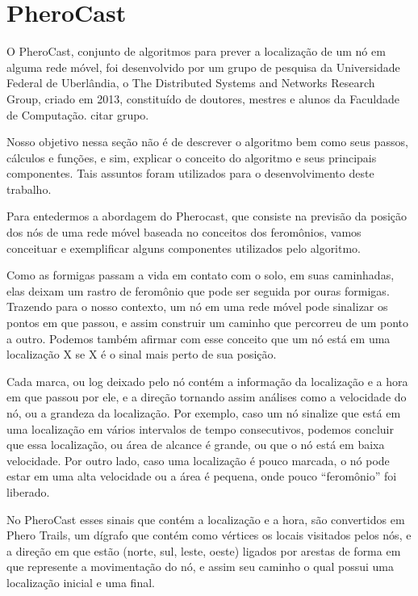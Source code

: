 \documentclass[12pt, %
openright, 
oneside,
a4paper,
brazil]{facom-ufu-abntex2}
\begin{document}
\section{PheroCast}

	O PheroCast, conjunto de algoritmos para prever a localização de um nó em alguma rede móvel, foi desenvolvido por um grupo de pesquisa da Universidade Federal de Uberlândia, o The Distributed Systems and Networks  Research Group, criado em 2013, constituído de doutores, mestres e alunos da Faculdade de Computação. citar grupo. 
	
	Nosso objetivo nessa seção não é de descrever o algoritmo bem como seus passos, cálculos e funções, e sim, explicar o conceito do algoritmo e seus principais componentes. Tais assuntos foram utilizados para o desenvolvimento deste trabalho.
	
	Para entedermos a abordagem do Pherocast, que consiste na previsão da posição dos nós de uma rede móvel baseada no conceitos dos feromônios, vamos conceituar e exemplificar alguns componentes utilizados pelo algoritmo.

	Como as formigas passam a vida em contato com o solo, em suas caminhadas, elas deixam um rastro de feromônio que pode ser seguida por ouras formigas. Trazendo para o nosso contexto, um nó em uma rede móvel pode sinalizar os pontos em que passou, e assim construir um caminho que percorreu de um ponto a outro. Podemos também afirmar com esse conceito que um nó está em uma localização X se X é o sinal mais perto de sua posição.
	
	\cite{6838650} Cada marca, ou log deixado pelo nó contém a informação da localização e a hora em que passou por ele, e a direção  tornando assim análises como a velocidade do nó, ou a grandeza da localização. Por exemplo, caso um nó sinalize que está em uma localização em vários intervalos de tempo consecutivos, podemos concluir que essa localização, ou área de alcance é grande, ou que o nó está em baixa velocidade. Por outro lado, caso uma localização é pouco marcada, o nó pode estar em uma alta velocidade ou a área é pequena, onde pouco ``feromônio'' foi liberado.
	
	No PheroCast esses sinais que contém a localização e a hora, são convertidos em Phero Trails, um dígrafo que contém como vértices os locais visitados pelos nós, e a direção em que estão (norte, sul, leste, oeste) ligados  por arestas de forma em que represente a movimentação do nó, e assim seu caminho o qual possui uma localização inicial e uma final.
	
\end{document}
